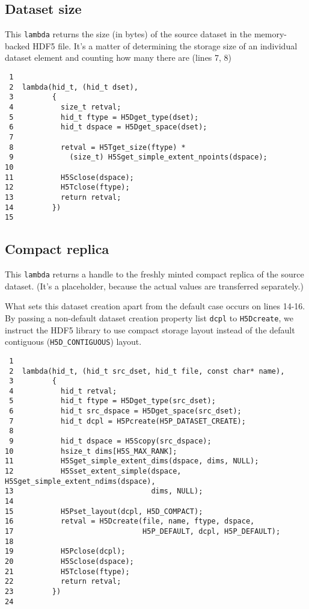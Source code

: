 \documentclass[a4paper, 12pt]{article}
\begin{document}
\subsection{Dataset size \label{orgfba2611}}
\label{sec:org471e392}

This \texttt{lambda} returns the size (in bytes) of the source dataset in the
memory-backed HDF5 file. It's a matter of determining the storage size of an
individual dataset element and counting how many there are (lines 7,
8)

\begin{verbatim}
 1
 2  lambda(hid_t, (hid_t dset),
 3         {
 4           size_t retval;
 5           hid_t ftype = H5Dget_type(dset);
 6           hid_t dspace = H5Dget_space(dset);
 7
 8           retval = H5Tget_size(ftype) *
 9             (size_t) H5Sget_simple_extent_npoints(dspace);
10
11           H5Sclose(dspace);
12           H5Tclose(ftype);
13           return retval;
14         })
15
\end{verbatim}

\subsection{Compact replica \label{org49ffde5}}
\label{sec:orga56b37e}

This \texttt{lambda} returns a handle to the freshly minted compact replica of the
source dataset. (It's a placeholder, because the actual values are transferred
separately.)

What sets this dataset creation apart from the default case occurs on lines
14-16. By passing a non-default dataset creation
property list \texttt{dcpl} to \texttt{H5Dcreate}, we instruct the HDF5 library to use
compact storage layout instead of the default contiguous (\texttt{H5D\_CONTIGUOUS})
layout.

\begin{verbatim}
 1
 2  lambda(hid_t, (hid_t src_dset, hid_t file, const char* name),
 3         {
 4           hid_t retval;
 5           hid_t ftype = H5Dget_type(src_dset);
 6           hid_t src_dspace = H5Dget_space(src_dset);
 7           hid_t dcpl = H5Pcreate(H5P_DATASET_CREATE);
 8
 9           hid_t dspace = H5Scopy(src_dspace);
10           hsize_t dims[H5S_MAX_RANK];
11           H5Sget_simple_extent_dims(dspace, dims, NULL);
12           H5Sset_extent_simple(dspace, H5Sget_simple_extent_ndims(dspace),
13                                dims, NULL);
14
15           H5Pset_layout(dcpl, H5D_COMPACT);
16           retval = H5Dcreate(file, name, ftype, dspace,
17                              H5P_DEFAULT, dcpl, H5P_DEFAULT);
18
19           H5Pclose(dcpl);
20           H5Sclose(dspace);
21           H5Tclose(ftype);
22           return retval;
23         })
24
\end{verbatim}
\end{document}
